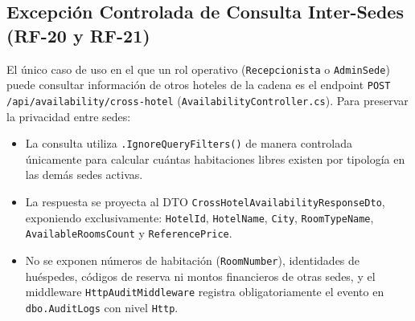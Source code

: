 \documentclass[12pt,a4paper]{article}
\begin{document}
\subsection{Excepci\'on Controlada de Consulta Inter-Sedes (RF-20 y RF-21)}
El \'unico caso de uso en el que un rol operativo (\texttt{Recepcionista} o \texttt{AdminSede}) puede consultar informaci\'on de otros hoteles de la cadena es el endpoint \texttt{POST /api/availability/cross-hotel} (\texttt{AvailabilityController.cs}). Para preservar la privacidad entre sedes:
\begin{itemize}
    \item La consulta utiliza \texttt{.IgnoreQueryFilters()} de manera controlada \'unicamente para calcular cu\'antas habitaciones libres existen por tipolog\'ia en las dem\'as sedes activas.
    \item La respuesta se proyecta al DTO \texttt{CrossHotelAvailabilityResponseDto}, exponiendo exclusivamente: \texttt{HotelId}, \texttt{HotelName}, \texttt{City}, \texttt{RoomTypeName}, \texttt{AvailableRoomsCount} y \texttt{ReferencePrice}.
    \item No se exponen n\'umeros de habitaci\'on (\texttt{RoomNumber}), identidades de hu\'espedes, c\'odigos de reserva ni montos financieros de otras sedes, y el middleware \texttt{HttpAuditMiddleware} registra obligatoriamente el evento en \texttt{dbo.AuditLogs} con nivel \texttt{Http}.
\end{itemize}
\end{document}
